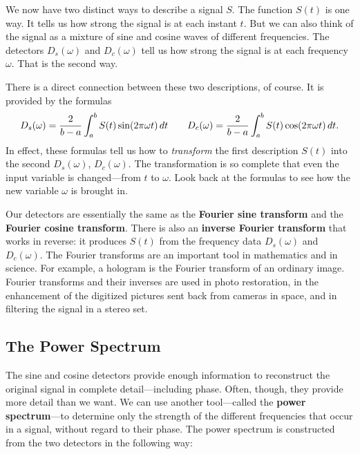 {{{{	We now have two distinct ways to describe a signal $S$.  The function $S(t)$ is one way.  It tells us how strong the signal is at each instant $t$.  But we can also think of the signal as a mixture of sine and cosine waves of different frequencies.  The detectors $D_s(\omega)$ and $D_c(\omega)$ tell us how strong the signal is at each frequency $\omega$.  That is the second way.  
	
	There is a direct connection between these two descriptions, of course.  It is provided by the formulas
	\[
D_s(\omega) = {2 \over b-a}
			\int_a^b S(t) \sin(2\pi\omega t)\,dt
		\qquad
	D_c(\omega) = {2 \over b-a}
			\int_a^b S(t) \cos(2\pi\omega t)\,dt.
\]
In effect, these formulas tell us how to {\em transform\/}  
the first description $S(t)$ into the second $D_s(\omega)$, $D_c(\omega)$.  The transformation is so complete that even the input variable is changed---from $t$ to $\omega$.  Look back at the formulas to see how the new variable $\omega$ is brought in.  

	Our detectors are essentially the same as the {\bf Fourier sine transform} and the {\bf Fourier cosine transform}.  There is also an {\bf inverse Fourier transform} that works in reverse: it produces $S(t)$ from the frequency data $D_s(\omega)$ and $D_c(\omega)$.  The Fourier transforms are an important tool in mathematics and in science.  For example, a hologram is the Fourier transform of an ordinary image.  Fourier transforms and their inverses are used in photo restoration, in the enhancement of the digitized pictures sent back from cameras in space, and in filtering the signal in a stereo set.   
	


\subsection{The Power Spectrum}

	The sine and cosine detectors provide enough information to reconstruct the original signal in complete detail---including phase.  
Often, though, they provide more detail than we want.  We can use another tool---called the {\bf power spectrum}---to determine only the strength of the different frequencies that occur in a signal, without regard to their phase. The power spectrum is constructed from the two detectors in the following way:
\begin{center}



\end{center}}}}}
